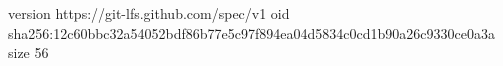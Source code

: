 version https://git-lfs.github.com/spec/v1
oid sha256:12c60bbc32a54052bdf86b77e5c97f894ea04d5834c0cd1b90a26c9330ce0a3a
size 56
